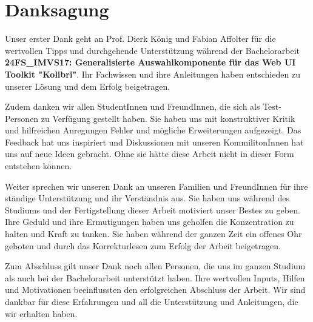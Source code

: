 \chapter*{Danksagung}

Unser erster Dank geht an Prof. Dierk König und Fabian Affolter für die wertvollen Tipps und durchgehende Unterstützung 
während der Bachelorarbeit \textbf{24FS\_IMVS17: Generalisierte Auswahlkomponente für das Web UI Toolkit "Kolibri"}. 
Ihr Fachwissen und ihre Anleitungen haben entschieden zu unserer Lösung und dem Erfolg beigetragen.

Zudem danken wir allen StudentInnen und FreundInnen, die sich als Test-Personen zu Verfügung gestellt haben.
Sie haben uns mit konstruktiver Kritik und hilfreichen Anregungen Fehler und mögliche Erweiterungen aufgezeigt.
Das Feedback hat uns inspiriert und Diskussionen mit unseren KommilitonInnen hat uns auf neue Ideen gebracht.
Ohne sie hätte diese Arbeit nicht in dieser Form entstehen können.

Weiter sprechen wir unseren Dank an unseren Familien und FreundInnen für ihre ständige Unterstützung und ihr Verständnis aus.
Sie haben uns während des Studiums und der Fertigstellung dieser Arbeit motiviert unser Bestes zu geben. 
Ihre Geduld und ihre Ermutigungen haben uns geholfen die Konzentration zu halten und Kraft zu tanken.
Sie haben während der ganzen Zeit ein offenes Ohr geboten und durch das Korrekturlesen zum Erfolg der Arbeit beigetragen.

Zum Abschluss gilt unser Dank noch allen Personen, die uns im ganzen Studium als auch bei der Bachelorarbeit unterstützt haben.
Ihre wertvollen Inputs, Hilfen und Motivationen beeinflussten den erfolgreichen Abschluss der Arbeit.
Wir sind dankbar für diese Erfahrungen und all die Unterstützung und Anleitungen, die wir erhalten haben.
